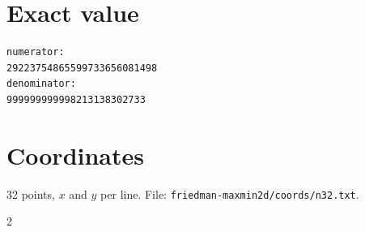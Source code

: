 \documentclass[11pt,a4paper]{article}
\begin{document}
\appendix
\section{Exact value}
{\small
\begin{verbatim}
numerator:
29223754865599733656081498
denominator:
999999999998213138302733
\end{verbatim}}

\section{Coordinates}
32 points, $x$ and $y$ per line. File: \texttt{friedman-maxmin2d/coords/n32.txt}.
{\tiny
\begin{multicols}{2}
\end{multicols}}
\end{document}
